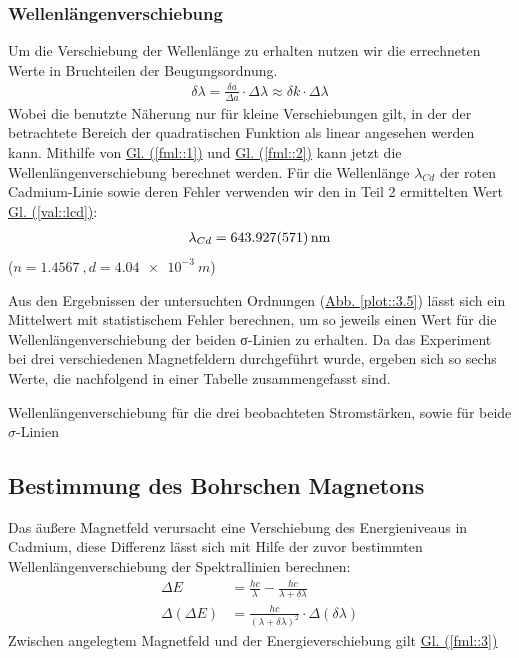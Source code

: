      \subsubsection{Wellenlängenverschiebung}
        Um die Verschiebung der Wellenlänge zu erhalten nutzen wir die errechneten Werte in Bruchteilen der Beugungsordnung.
        \begin{align}
          \delta \lambda = \frac{\delta a}{\Delta a}\cdot \Delta \lambda \approx \delta k\cdot \Delta\lambda \label{fml::2}
        \end{align}
        Wobei die benutzte Näherung nur für kleine Verschiebungen gilt, in der der betrachtete Bereich der quadratischen Funktion als linear angesehen werden kann. Mithilfe von \hyperref[fml::1]{Gl. (\ref*{fml::1})}
        und \hyperref[fml::2]{Gl. (\ref*{fml::2})} kann jetzt die Wellenlängenverschiebung berechnet werden. Für die Wellenlänge $\lambda_{Cd}$ der roten Cadmium-Linie sowie deren Fehler verwenden wir den in Teil 2 ermittelten Wert \hyperref[val::lcd]{Gl. (\ref*{val::lcd})}:
        \begin{align}
          \lambda_{Cd} = \SI{643.927+-0.571}{\nano\metre}
        \end{align}
        ($n = \SI{1.4567}{}, d=\SI{4.04e-3}{m}$)

        Aus den Ergebnissen der untersuchten Ordnungen (\hyperref[plot::3.5]{Abb. \ref*{plot::3.5}}) lässt sich ein Mittelwert mit statistischem Fehler berechnen, um so jeweils einen Wert für die Wellenlängenverschiebung der beiden σ-Linien zu erhalten. Da das Experiment bei drei verschiedenen Magnetfeldern durchgeführt wurde, ergeben sich so sechs Werte, die nachfolgend in einer Tabelle zusammengefasst sind.
        \begin{table}[H]
          \centering
          
          \caption{Wellenlängenverschiebung für die drei beobachteten Stromstärken, sowie für beide $\sigma$-Linien}
          \label{tab::1}
        \end{table}

      \subsection{Bestimmung des Bohrschen Magnetons}
        Das äußere Magnetfeld verursacht eine Verschiebung des Energieniveaus in Cadmium, diese Differenz lässt sich mit Hilfe der zuvor bestimmten Wellenlängenverschiebung der Spektrallinien berechnen:
        \begin{align}
          \Delta E         &= \frac{hc}\lambda-\frac{hc}{\lambda+\delta\lambda}\\
          \Delta(\Delta E) &= \frac{hc}{(\lambda+\delta\lambda)^2}\cdot\Delta(\delta\lambda)
        \end{align}
        Zwischen angelegtem Magnetfeld und der Energieverschiebung gilt \hyperref[fml::3]{Gl. (\ref*{fml::3})}

